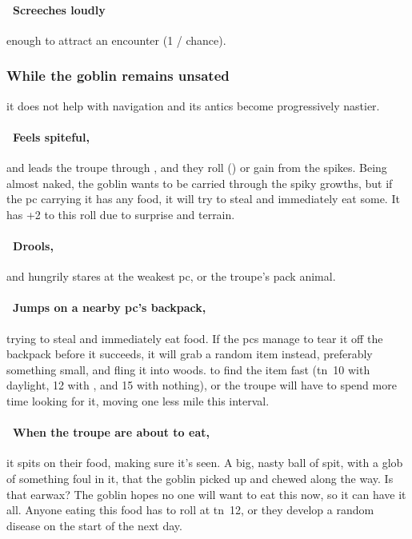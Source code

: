 \documentclass[10pt,twoside]{book}
\begin{document}
\paragraph{\Square~Screeches loudly}
enough to attract an encounter (1 /  chance).

\subsubsection{While the goblin remains unsated}
it does not help with \gls{navigation} and its antics become progressively nastier.

\paragraph{\Square~Feels spiteful,}
and leads the troupe through , and they roll  (\tn[10]) or gain  from the spikes.
Being almost naked, the goblin wants to be carried through the spiky growths, but if the \gls{pc} carrying it has any food, it will try to steal and immediately eat some.
It has +2 to this roll due to surprise and terrain.


\paragraph{\Square~Drools,}
and hungrily stares at the weakest \gls{pc}, or the troupe's pack animal.

\paragraph{\Square~Jumps on a nearby \gls{pc}'s backpack,}
trying to steal and immediately eat food.
If the \glspl{pc} manage to tear it off the backpack before it succeeds, it will grab a random item instead, preferably something small, and fling it into woods.
 to find the item fast (\gls{tn}~10 with daylight, 12 with , and 15 with nothing), or the troupe will have to spend more time looking for it, moving one less mile this \gls{interval}.

\paragraph{\Square~When the troupe are about to eat,}
it spits on their food, making sure it's seen.
A big, nasty ball of spit, with a glob of something foul in it, that the goblin picked up and chewed along the way.
Is that earwax?
The goblin hopes no one will want to eat this now, so it can have it all.
Anyone eating this food has to roll  at \gls{tn}~12, or they develop a random disease%
on the start of the next day.
\end{document}
